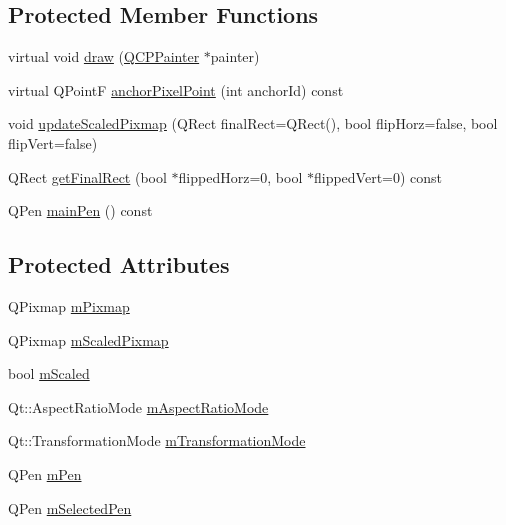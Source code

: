 \subsection*{Protected Member Functions}
\begin{DoxyCompactItemize}
\item 
virtual void \hyperlink{class_q_c_p_item_pixmap_a879e8076c2db01a38b34cfa73ec95d2f}{draw} (\hyperlink{class_q_c_p_painter}{Q\+C\+P\+Painter} $\ast$painter)
\item 
virtual Q\+Point\+F \hyperlink{class_q_c_p_item_pixmap_a88abce3c1027f371cddcf6dad35ffbb1}{anchor\+Pixel\+Point} (int anchor\+Id) const 
\item 
void \hyperlink{class_q_c_p_item_pixmap_a8bced3027b326b290726cd1979c7cfc6}{update\+Scaled\+Pixmap} (Q\+Rect final\+Rect=Q\+Rect(), bool flip\+Horz=false, bool flip\+Vert=false)
\item 
Q\+Rect \hyperlink{class_q_c_p_item_pixmap_a245ef0c626cab7096a810442f2f6a2d9}{get\+Final\+Rect} (bool $\ast$flipped\+Horz=0, bool $\ast$flipped\+Vert=0) const 
\item 
Q\+Pen \hyperlink{class_q_c_p_item_pixmap_af21085516585c475dc9d839e7f377233}{main\+Pen} () const 
\end{DoxyCompactItemize}
\subsection*{Protected Attributes}
\begin{DoxyCompactItemize}
\item 
Q\+Pixmap \hyperlink{class_q_c_p_item_pixmap_a1396cce7f26c7b8e9512906284380c4d}{m\+Pixmap}
\item 
Q\+Pixmap \hyperlink{class_q_c_p_item_pixmap_a2ebc66e15b9f1264563d58f29ba1bc00}{m\+Scaled\+Pixmap}
\item 
bool \hyperlink{class_q_c_p_item_pixmap_a8fe670a529cd46a9b8afd9fc1203bc3f}{m\+Scaled}
\item 
Qt\+::\+Aspect\+Ratio\+Mode \hyperlink{class_q_c_p_item_pixmap_a8dc6b6c1e106ac523efae22d5fe55bab}{m\+Aspect\+Ratio\+Mode}
\item 
Qt\+::\+Transformation\+Mode \hyperlink{class_q_c_p_item_pixmap_ac9ecad3b9842363754e32eda2cf821bd}{m\+Transformation\+Mode}
\item 
Q\+Pen \hyperlink{class_q_c_p_item_pixmap_acfee1124eb51a1887aaf8de10777c7a1}{m\+Pen}
\item 
Q\+Pen \hyperlink{class_q_c_p_item_pixmap_a0949e5bb6a261fc4e9668e28e2effcfa}{m\+Selected\+Pen}
\end{DoxyCompactItemize}
